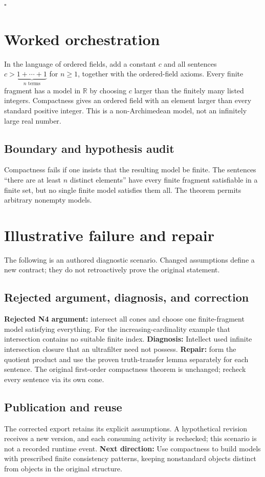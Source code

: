 \documentclass[preprint,12pt,aps,pra,showkeys,amsmath,amssymb,superscriptaddress,floatfix]{revtex4-2}
\theoremstyle{definition}
\theoremstyle{remark}
\begin{document}
\hfill$\square$

\section{Worked orchestration}

In the language of ordered fields, add a constant \(c\) and all
sentences \(c>\underbrace{1+\cdots+1}_{n\text{ terms}}\) for \(n\ge1\),
together with the ordered-field axioms. Every finite fragment has a
model in \(\mathbb R\) by choosing \(c\) larger than the finitely many
listed integers. Compactness gives an ordered field with an element
larger than every standard positive integer. This is a non-Archimedean
model, not an infinitely large real number.

\subsection{Boundary and hypothesis audit}

Compactness fails if one insists that the resulting model be finite. The
sentences ``there are at least \(n\) distinct elements'' have every
finite fragment satisfiable in a finite set, but no single finite model
satisfies them all. The theorem permits arbitrary nonempty models.

\section{Illustrative failure and repair}

The following is an authored diagnostic scenario. Changed assumptions
define a new contract; they do not retroactively prove the original
statement.

\subsection{Rejected argument, diagnosis, and correction}
\textbf{Rejected N4 argument:} intersect all cones and choose one
finite-fragment model satisfying everything. For the
increasing-cardinality example that intersection contains no suitable
finite index. \textbf{Diagnosis:} Intellect used infinite intersection
closure that an ultrafilter need not possess. \textbf{Repair:} form the
quotient product and use the proven truth-transfer lemma separately for
each sentence. The original first-order compactness theorem is
unchanged; recheck every sentence via its own cone.

\subsection{Publication and reuse}
The corrected export retains its explicit assumptions. A hypothetical
revision receives a new version, and each consuming activity is
rechecked; this scenario is not a recorded runtime event. \textbf{Next
direction:} Use compactness to build models with prescribed finite
consistency patterns, keeping nonstandard objects distinct from objects
in the original structure.
\end{document}
